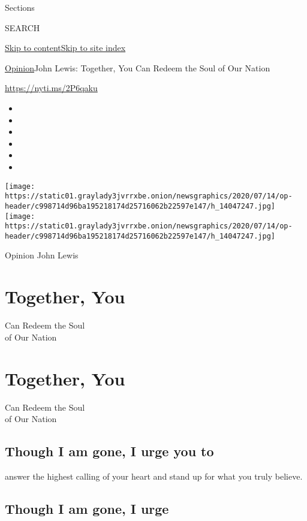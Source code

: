 Sections

SEARCH

\protect\hyperlink{site-content}{Skip to
content}\protect\hyperlink{site-index}{Skip to site index}

\href{/section/opinion}{Opinion}\textbar{}John Lewis: Together, You Can
Redeem the Soul of Our Nation

\url{https://nyti.ms/2P6qaku}

\begin{itemize}
\item
\item
\item
\item
\item
\item
\end{itemize}

\texttt{[image: https://static01.graylady3jvrrxbe.onion/newsgraphics/2020/07/14/op-header/c998714d96ba195218174d25716062b22597e147/h\_14047247.jpg]}
\texttt{[image: https://static01.graylady3jvrrxbe.onion/newsgraphics/2020/07/14/op-header/c998714d96ba195218174d25716062b22597e147/h\_14047247.jpg]}

 Opinion John Lewis

\hypertarget{together-you}{%
\section{Together, You}\label{together-you}}

Can Redeem the Soul\\
of Our Nation

\hypertarget{together-you-1}{%
\section{Together, You}\label{together-you-1}}

Can Redeem the Soul\\
of Our Nation

\hypertarget{though-i-am-gone-i-urge-you-to}{%
\subsection{Though I am gone, I urge you
to}\label{though-i-am-gone-i-urge-you-to}}

answer the highest calling of your heart and stand up for what you truly
believe.

\hypertarget{though-i-am-gone-i-urge}{%
\subsection{Though I am gone, I urge}\label{though-i-am-gone-i-urge}}

